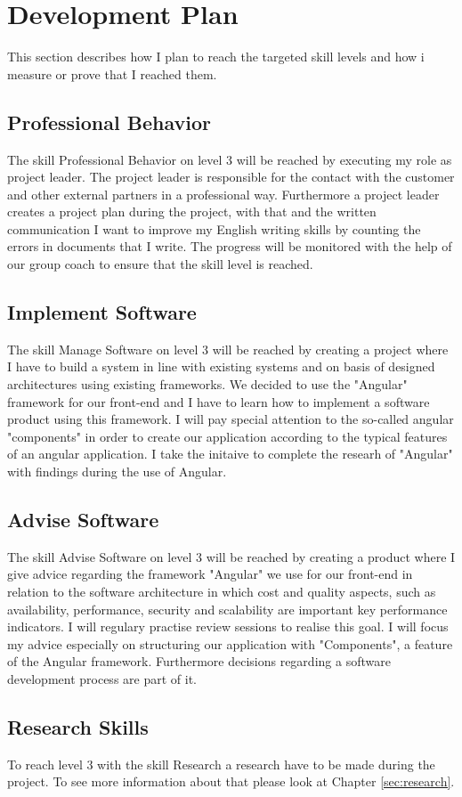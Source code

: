 \section{Development Plan}
\label{sec:development}
This section describes how I plan to reach the targeted skill levels and how i measure or prove that I reached them.

\subsection{Professional Behavior}
The skill Professional Behavior on level 3 will be reached by executing my role as project leader. The project leader is responsible for the contact with the customer and other external partners in a professional way. 
\newline
Furthermore a project leader creates a project plan during the project, with that and the written communication I want to improve my English writing skills by counting the errors in documents that I write. The progress will be monitored with the help of our group coach to ensure that the skill level is reached.

\subsection{Implement Software}
The skill Manage Software on level 3 will be reached by creating a project where I have to build a system in line with existing systems and on basis of designed architectures 
using existing frameworks. We decided to use the "Angular" framework for our front-end and I have to learn how to implement a software product using this framework. I will pay special attention to the so-called angular "components" in order to create our application according to the typical features of an angular application. I take the initaive to complete the researh of "Angular" with findings during the use of Angular.

\subsection{Advise Software}
The skill Advise Software on level 3 will be reached by creating a product where I give advice regarding the framework "Angular" we use for our front-end in relation to the software architecture in which cost and quality aspects, such as availability, performance, security and scalability are important key performance indicators. I will regulary practise review sessions to realise this goal.  I will focus my advice especially on structuring our application with "Components", a feature of  the Angular framework. Furthermore decisions regarding a software development process are part of it.   

\subsection{Research Skills}
To reach level 3 with the skill Research a research have to be made during the project. To see more information about that please look at Chapter \ref{sec:research}.